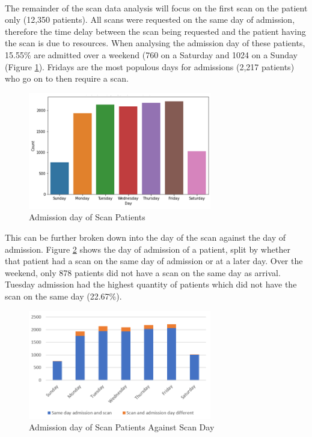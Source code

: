 \documentclass[../thesis.tex]{subfiles}
\begin{document}
\\
The remainder of the scan data analysis will focus on the first scan on the patient only (12,350 patients). All scans were requested on the same day of admission, therefore the time delay between the scan being requested and the patient having the scan is due to resources. When analysing the admission day of these patients, 15.55\% are admitted over a weekend (760 on a Saturday and 1024 on a Sunday (Figure \ref{Fig:RadisDay}). Fridays are the most populous days for admissions (2,217 patients) who go on to then require a scan.

\begin{figure}[H]
    \centering
    \includegraphics[width = 8cm]{Chapter3/Figures/RADIS-Day.png}
    \caption{Admission day of Scan Patients}
    \label{Fig:RadisDay}
\end{figure}

This can be further broken down into the day of the scan against the day of admission. Figure \ref{Fig:RadisDayScan} shows the day of admission of a patient, split by whether that patient had a scan on the same day of admission or at a later day. Over the weekend, only 878 patients did not have a scan on the same day as arrival. Tuesday admission had the highest quantity of patients which did not have the scan on the same day (22.67\%).

\begin{figure}[H]
    \centering
    \includegraphics[width = 8cm]{Chapter3/Figures/Day against scan day.png}
    \caption{Admission day of Scan Patients Against Scan Day}
    \label{Fig:RadisDayScan}
\end{figure}
\end{document}
